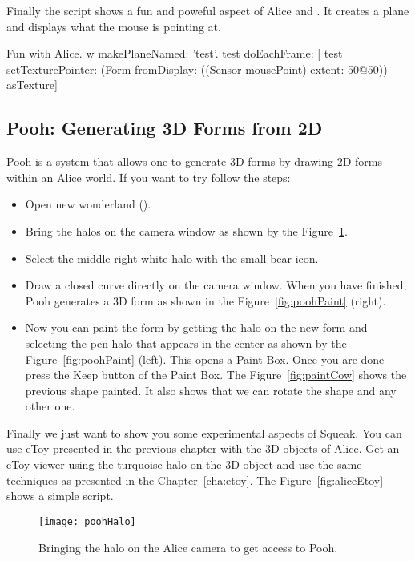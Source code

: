 Finally the script  shows a fun and poweful aspect of Alice and \sq. It creates a plane and displays what the mouse is pointing at.  

\begin{scriptwithtitle}{Fun with Alice.}\label{scr:planealice}
w makePlaneNamed: 'test'.
test  
   doEachFrame: 
      [ test setTexturePointer: 
      (Form fromDisplay: ((Sensor mousePoint) extent: 50@50)) asTexture]
\end{scriptwithtitle}


\subsection*{Pooh: Generating 3D Forms from 2D}
Pooh is a system that allows one to generate 3D forms by drawing 2D forms within 
an Alice world. If you want to try follow the steps:

\begin{itemize}
\item Open new wonderland ().
\item Bring the halos on the camera window as shown by the Figure~\ref{fig:pooh}.
\item Select the middle right white halo with the small bear icon.
\item Draw a closed curve directly on the camera window. When you have finished, Pooh generates a 3D form as shown in the Figure~\ref{fig:poohPaint} (right).
\item Now you can paint the form by getting the halo on the new form and selecting the pen halo that appears in the center as shown by the Figure~\ref{fig:poohPaint} (left). This opens a Paint Box. Once you are done press the Keep button of the Paint Box. The Figure~\ref{fig:paintCow} shows the previous shape painted. It also shows that we can rotate the shape and any other one.
\end{itemize}

Finally we just want to show you some experimental aspects of Squeak. You can use eToy presented in the previous chapter with the 3D objects of Alice. Get an eToy viewer using the turquoise halo on the 3D object and use the same techniques as presented in the Chapter~\ref{cha:etoy}. The Figure~\ref{fig:aliceEtoy} shows a simple script. 

\begin{figure}[h]
\begin{center}\texttt{[image: poohHalo]}\end{center}
\caption{Bringing the halo on the Alice camera to get access to Pooh. \label{fig:pooh}}
\end{figure}

